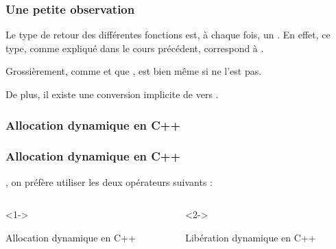 \documentclass{cppcourses}
\begin{document}
\begin{frame}

\frametitle{Une petite observation}

\begin{remark}

Le type de retour des différentes fonctions est, à chaque fois, un \mykeyword{\textcolor{blue}{void}*}. En effet, ce type, comme expliqué dans le cours précédent, correspond à .

Grossièrement, comme  et que , \mykeyword{\textcolor{blue}{void}*} est bien  même si \mykeyword{\textcolor{blue}{void}} ne l'est pas.

De plus, il existe une conversion implicite de \mykeyword{\textcolor{blue}{type}*} vers \mykeyword{\textcolor{blue}{void}*}.

\end{remark}

\end{frame}

\subsubsection{Allocation dynamique en C++}

\begin{frame}

\frametitle{Allocation dynamique en C++}

, on préfère utiliser les deux opérateurs suivants :

\begin{columns}

\begin{column}{0.5 \textwidth}

\begin{myfigure}<1->
 \\
\caption{Allocation dynamique en C++}
\end{myfigure}

\end{column}

\begin{column}{0.5 \textwidth}

\begin{myfigure}<2->
 \\
\caption{Libération dynamique en C++}
\end{myfigure}

\end{column}

\end{columns}

\end{frame}
\end{document}
